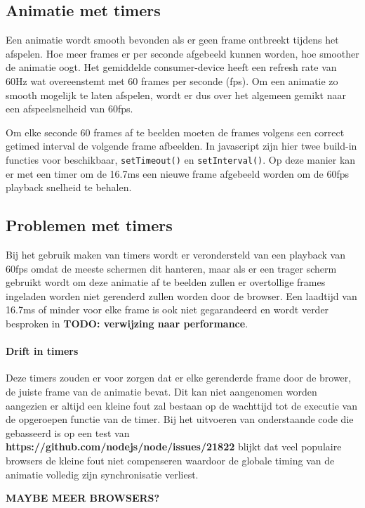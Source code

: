 \subsection{Animatie met timers}

Een animatie wordt smooth bevonden als er geen frame ontbreekt tijdens het afspelen. Hoe meer frames er per seconde afgebeeld kunnen worden, hoe smoother de animatie oogt. Het gemiddelde consumer-device heeft een refresh rate van 60Hz wat overeenstemt met 60 frames per seconde (fps). Om een animatie zo smooth mogelijk te laten afspelen, wordt er dus over het algemeen gemikt naar een afspeelsnelheid van 60fps.

Om elke seconde 60 frames af te beelden moeten de frames volgens een correct getimed interval de volgende frame afbeelden. In javascript zijn hier twee build-in functies voor beschikbaar, \texttt{setTimeout()} en \texttt{setInterval()}. Op deze manier kan er met een timer om de 16.7ms een nieuwe frame afgebeeld worden om de 60fps playback snelheid te behalen.

\subsection{Problemen met timers}
Bij het gebruik maken van timers wordt er verondersteld van een playback van 60fps omdat de meeste schermen dit hanteren, maar als er een trager scherm gebruikt wordt om deze animatie af te beelden zullen er overtollige frames ingeladen worden niet gerenderd zullen worden door de browser. Een laadtijd van 16.7ms of minder voor elke frame is ook niet gegarandeerd en wordt verder besproken in \textbf{TODO: verwijzing naar performance}. 

\paragraph{Drift in timers}Deze timers zouden er voor zorgen dat er elke gerenderde frame door de brower, de juiste frame van de animatie bevat. Dit kan niet aangenomen worden aangezien er altijd een kleine fout zal bestaan op de wachttijd tot de executie van de opgeroepen functie van de timer. Bij het uitvoeren van onderstaande code die gebasseerd is op een test van \textbf{https://github.com/nodejs/node/issues/21822} blijkt dat veel populaire browsers de kleine fout niet compenseren waardoor de globale timing van de animatie volledig zijn synchronisatie verliest.

\textbf{MAYBE MEER BROWSERS?}

